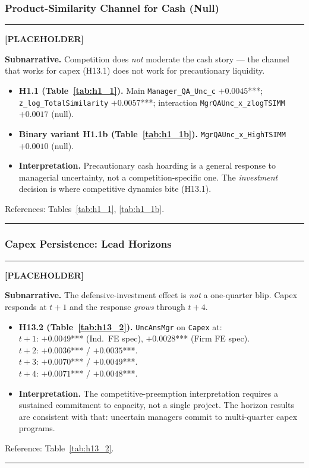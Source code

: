 \documentclass[11pt,a4paper,twocolumn]{article}
\newenvironment{placeholder}{%
  \par\medskip\noindent%
  {\color{placeholderaccent}\rule{\linewidth}{0.4pt}}\par%
  \noindent\textbf{\color{placeholderaccent}[PLACEHOLDER]}\par%
  \smallskip\itshape%
}{%
  \par\upshape\smallskip%
  {\color{placeholderaccent}\rule{\linewidth}{0.4pt}}\par\medskip%
}
\begin{document}
\subsubsection{Product-Similarity Channel for Cash (Null)}
\label{sec:appI_h11}
\begin{placeholder}
\textbf{Subnarrative.} Competition does \emph{not} moderate the cash
story --- the channel that works for capex (H13.1) does not work for
precautionary liquidity.
\begin{itemize}
  \item \textbf{H1.1 (Table~\ref{tab:h1_1}).} Main
        \texttt{Manager\_QA\_Unc\_c} $+0.0045$***;
        \texttt{z\_log\_TotalSimilarity} $+0.0057$***; interaction
        \texttt{MgrQAUnc\_x\_zlogTSIMM} $+0.0017$ (null).
  \item \textbf{Binary variant H1.1b (Table~\ref{tab:h1_1b}).}
        \texttt{MgrQAUnc\_x\_HighTSIMM} $+0.0010$ (null).
  \item \textbf{Interpretation.} Precautionary cash hoarding is a
        general response to managerial uncertainty, not a
        competition-specific one. The \emph{investment} decision is
        where competitive dynamics bite (H13.1).
\end{itemize}
References: Tables~\ref{tab:h1_1}, \ref{tab:h1_1b}.
\end{placeholder}

\subsubsection{Capex Persistence: Lead Horizons}
\label{sec:appI_h132}
\begin{placeholder}
\textbf{Subnarrative.} The defensive-investment effect is \emph{not}
a one-quarter blip. Capex responds at $t+1$ and the response
\emph{grows} through $t+4$.
\begin{itemize}
  \item \textbf{H13.2 (Table~\ref{tab:h13_2}).} \texttt{UncAnsMgr}
        on \texttt{Capex} at:\\
        $t+1$: $+0.0049$*** (Ind.\ FE spec), $+0.0028$*** (Firm FE spec).\\
        $t+2$: $+0.0036$*** / $+0.0035$***.\\
        $t+3$: $+0.0070$*** / $+0.0049$***.\\
        $t+4$: $+0.0071$*** / $+0.0048$***.
  \item \textbf{Interpretation.} The competitive-preemption
        interpretation requires a sustained commitment to capacity,
        not a single project. The horizon results are consistent with
        that: uncertain managers commit to multi-quarter capex
        programs.
\end{itemize}
Reference: Table~\ref{tab:h13_2}.
\end{placeholder}
\end{document}
